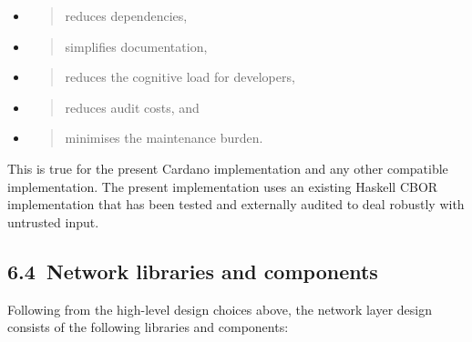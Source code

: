 \documentclass[11pt,a4paper]{article}
\begin{document}
\begin{itemize}
\item
  \begin{quote}
  reduces dependencies,
  \end{quote}
\item
  \begin{quote}
  simplifies documentation,
  \end{quote}
\item
  \begin{quote}
  reduces the cognitive load for developers,
  \end{quote}
\item
  \begin{quote}
  reduces audit costs, and
  \end{quote}
\item
  \begin{quote}
  minimises the maintenance burden.
  \end{quote}
\end{itemize}

This is true for the present Cardano implementation and any other
compatible implementation. The present implementation uses an existing
Haskell CBOR implementation that has been tested and externally audited
to deal robustly with untrusted input.

\hypertarget{network-libraries-and-components}{%
\subsection{​6.4​~Network libraries and
components}\label{network-libraries-and-components}}

Following from the high-level design choices above, the network layer
design consists of the following libraries and components:
\end{document}
